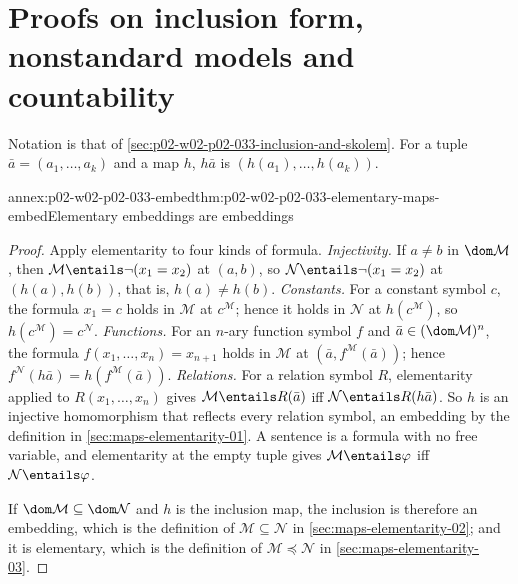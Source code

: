 \section{Proofs on inclusion form, nonstandard models and countability}
\label{sec:annex-p02-w02-p02-033-inclusion-and-skolem}

Notation is that of \cref{sec:p02-w02-p02-033-inclusion-and-skolem}.  For a
tuple \(\bar a=(a_1,\ldots,a_k)\) and a map \(h\), \(h\bar a\) is
\((h(a_1),\ldots,h(a_k))\).

\begin{annexitem}{annex:p02-w02-p02-033-embed}{thm:p02-w02-p02-033-elementary-maps-embed}{Elementary embeddings are embeddings}
\begin{proof}
Apply elementarity to four kinds of formula.
\emph{Injectivity.} If \(a\ne b\) in \(\dom\mathcal M\), then
\(\mathcal M\entails\neg(x_1=x_2)\) at \((a,b)\), so
\(\mathcal N\entails\neg(x_1=x_2)\) at \((h(a),h(b))\), that is,
\(h(a)\ne h(b)\).
\emph{Constants.} For a constant symbol \(c\), the formula \(x_1=c\) holds in
\(\mathcal M\) at \(c^{\mathcal M}\); hence it holds in \(\mathcal N\) at
\(h(c^{\mathcal M})\), so \(h(c^{\mathcal M})=c^{\mathcal N}\).
\emph{Functions.} For an \(n\)-ary function symbol \(f\) and
\(\bar a\in(\dom\mathcal M)^n\), the formula
\(f(x_1,\ldots,x_n)=x_{n+1}\) holds in \(\mathcal M\) at
\((\bar a,f^{\mathcal M}(\bar a))\); hence
\(f^{\mathcal N}(h\bar a)=h(f^{\mathcal M}(\bar a))\).
\emph{Relations.} For a relation symbol \(R\), elementarity applied to
\(R(x_1,\ldots,x_n)\) gives
\(\mathcal M\entails R(\bar a)\) iff \(\mathcal N\entails R(h\bar a)\).
So \(h\) is an injective homomorphism that reflects every relation symbol,
an embedding by the definition in \cref{sec:maps-elementarity-01}.  A
sentence is a formula with no free variable, and elementarity at the empty
tuple gives \(\mathcal M\entails\varphi\) iff \(\mathcal N\entails\varphi\).

If \(\dom\mathcal M\subseteq\dom\mathcal N\) and \(h\) is the inclusion
map, the inclusion is therefore an embedding, which is the definition of
\(\mathcal M\subseteq\mathcal N\) in \cref{sec:maps-elementarity-02}; and it
is elementary, which is the definition of
\(\mathcal M\preccurlyeq\mathcal N\) in \cref{sec:maps-elementarity-03}.
\end{proof}
\end{annexitem}

